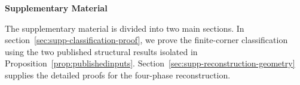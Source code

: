 \documentclass[aps,prx,reprint,nofootinbib,twoside,superscriptaddress,longbibliography,floatfix]{revtex4-2}
\theoremstyle{definition}
\begin{document}
\setcounter{theorem}{0}
\renewcommand{\thetheorem}{S.\arabic{theorem}}

\makeatletter
\renewcommand{\theHsection}{supp.\arabic{section}}
\renewcommand{\theHequation}{supp.\arabic{section}.\arabic{equation}}
\providecommand{\theHtheorem}{}
\renewcommand{\theHtheorem}{supp.\arabic{theorem}}
\makeatother

\makeatletter
\newcommand{\LLM@suppsectionnumber}{}
\newcommand{\LLM@suppsubsectionnumber}{}
\newcommand{\LLM@sectionnumberline}[1]{%
  \xdef\LLM@suppsectionnumber{#1}%
  \hb@xt@\@tempdima{\bfseries #1\hfil}}
\newcommand{\LLM@subsectionnumberline}[1]{%
  \xdef\LLM@suppsubsectionnumber{\LLM@suppsectionnumber.#1}%
  \hb@xt@\@tempdima{\LLM@suppsubsectionnumber\hfil}}
\newcommand{\LLM@subsubsectionnumberline}[1]{%
  \hb@xt@\@tempdima{\LLM@suppsubsectionnumber.#1\hfil}}
\newcommand{\supplementaltableofcontents}{%
  \begin{center}\large\bfseries{Supplemental contents}\end{center}\vspace{0.25em}%
  \begingroup
  \setcounter{tocdepth}{3}%
  \setlength{\parskip}{0pt}%
  \renewcommand*\l@section[2]{%
    \addpenalty{-\@highpenalty}\addvspace{0.45em}%
    \begingroup\bfseries
    \let\numberline\LLM@sectionnumberline
    \@dottedtocline{1}{0em}{3.2em}{##1}{##2}%
    \endgroup}%
  \renewcommand*\l@subsection[2]{%
    \begingroup
    \let\numberline\LLM@subsectionnumberline
    \@dottedtocline{2}{1.5em}{4.2em}{##1}{##2}%
    \endgroup}%
  \renewcommand*\l@subsubsection[2]{%
    \begingroup\itshape
    \let\numberline\LLM@subsubsectionnumberline
    \@dottedtocline{3}{3.5em}{5.0em}{##1}{##2}%
    \endgroup}%
  \@starttoc{stoc}%
  \endgroup}
\let\LLM@addcontentsline\addcontentsline
\renewcommand{\addcontentsline}[3]{%
  \def\LLM@target{#1}%
  \def\LLM@toc{toc}%
  \ifx\LLM@target\LLM@toc
    \LLM@addcontentsline{stoc}{#2}{#3}%
  \else
    \LLM@addcontentsline{#1}{#2}{#3}%
  \fi}
\makeatother
\begin{center}
\large\bfseries Supplementary Material
\end{center}
\newcommand{\subproofheading}[1]{%
  \par\medskip\noindent\textbf{#1}\par\smallskip}

{The supplementary material is divided into two main sections. In section~\ref{sec:supp-classification-proof}, we prove the finite-corner classification using the two published structural results isolated in Proposition~\ref{prop:publishedinputs}. Section~\ref{sec:supp-reconstruction-geometry} supplies the detailed proofs for the four-phase reconstruction.}
\end{document}
